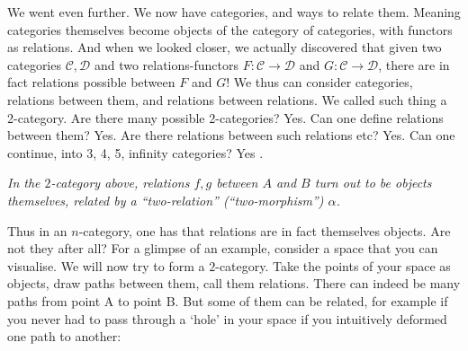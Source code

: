 \documentclass{article}
\begin{document}
We went even further. We now have categories, and ways to relate them. Meaning categories themselves become objects of the category of categories, with functors as relations. And when we looked closer, we actually discovered that given two categories $\mathcal C, \mathcal D$ and two relations-functors $F: \mathcal C \to \mathcal D$ and $G: \mathcal C \to \mathcal D$, there are in fact relations possible between $F$ and $G$! We thus can consider categories, relations between them, and relations between relations. We called such thing a 2-category. Are there many possible 2-categories? Yes. Can one define relations between them? Yes. Are there relations between such relations etc? Yes. Can one continue, into 3, 4, 5, infinity categories? Yes \cite{BAEZ, NLABINFTY}.

\begin{center}

\smallskip

\textit{In the $2$-category above, relations $f,g$ between $A$ and $B$ turn out to be objects themselves, related by a ``two-relation'' (``two-morphism'') $\alpha$.}
\end{center}


Thus in an $n$-category, one has that relations are in fact themselves objects. Are not they after all? For a glimpse of an example, consider a space that you can visualise. We will now try to form a $2$-category. Take the points of your space as objects, draw paths between them, call them relations. There can indeed be many paths from point A to point B. But some of them can be related, for example if you never had to pass through a ‘hole’ in your space if you intuitively deformed one path to another:
\end{document}
